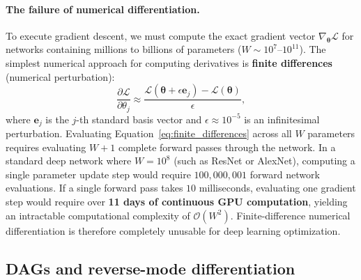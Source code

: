 \paragraph{The failure of numerical differentiation.}
To execute gradient descent, we must compute the exact gradient vector $\nabla_{\boldsymbol{\theta}} \mathcal{L}$ for networks containing millions to billions of parameters ($W \sim 10^7$--$10^{11}$). The simplest numerical approach for computing derivatives is \textbf{finite differences} (numerical perturbation):
\begin{equation}
\frac{\partial \mathcal{L}}{\partial \theta_j} \approx \frac{\mathcal{L}(\boldsymbol{\theta} + \epsilon \mathbf{e}_j) - \mathcal{L}(\boldsymbol{\theta})}{\epsilon},
\label{eq:finite_differences}
\end{equation}
where $\mathbf{e}_j$ is the $j$-th standard basis vector and $\epsilon \approx 10^{-5}$ is an infinitesimal perturbation. Evaluating Equation~\eqref{eq:finite_differences} across all $W$ parameters requires evaluating $W + 1$ complete forward passes through the network. In a standard deep network where $W = 10^8$ (such as ResNet or AlexNet), computing a single parameter update step would require $100{,}000{,}001$ forward network evaluations. If a single forward pass takes $10$ milliseconds, evaluating one gradient step would require over \textbf{11 days of continuous GPU computation}, yielding an intractable computational complexity of $\mathcal{O}(W^2)$. Finite-difference numerical differentiation is therefore completely unusable for deep learning optimization.

\subsection{DAGs and reverse-mode differentiation}
\label{sec:dag_computational_graphs}
\label{sec:autodiff_modes}

